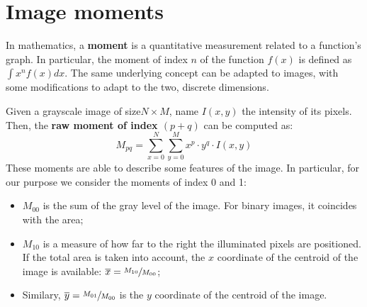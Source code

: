 \section{Image moments}

In mathematics, a \textbf{moment} is a quantitative measurement related to a function's graph.
In particular, the moment of index $n$ of the function $f(x)$ is defined as $\int x^n f(x) dx$.
The same underlying concept can be adapted to images, with some modifications to adapt to the two, discrete dimensions.

Given a grayscale image of size$N{\times}M$, name $I(x,y)$ the intensity of its pixels.
Then, the \textbf{raw moment of index $(p{+}q)$} can be computed as: $$M_{pq} = \sum_{x=0}^{N} \sum_{y=0}^{M} x^p{\cdot}y^q{\cdot}I(x,y)$$
These moments are able to describe some features of the image.
In particular, for our purpose we consider the moments of index 0 and 1:
\begin{itemize}
	\itemsep 0em
	\item $M_{00}$ is the sum of the gray level of the image. For binary images, it coincides with the area;
	\item $M_{10}$ is a measure of how far to the right the illuminated pixels are positioned. If the total area is taken into account, the $x$ coordinate of the centroid of the image is available: $\overline{x} = \sfrac{M_{10}}{M_{00}}$;
	\item Similary, $\overline{y} = \sfrac{M_{01}}{M_{00}}$ is the $y$ coordinate of the centroid of the image.
\end{itemize}
